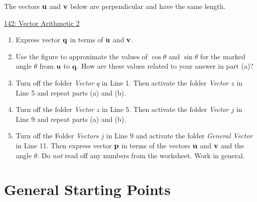 \documentclass{ximera}
\begin{document}
\begin{question} \label{QLf45445rr33r3}

The vectors ${\bf u}$ and ${\bf v}$ below are perpendicular and have the same length.

\begin{onlineOnly}
    \begin{center}
\end{center}
\end{onlineOnly}

\href{https://www.desmos.com/calculator/prtepbs3ul}{142: Vector Arithmetic 2}


\begin{enumerate}
\item Express vector ${\bf q}$ in terms of ${\bf u}$ and ${\bf v}$. 

\item Use the figure to approximate the values of $\cos\theta$ and $\sin\theta$ for the marked angle $\theta$ from ${\bf u}$ to ${\bf q}$. How are these values related to your answer in part (a)?

\item Turn off the folder \emph{Vector $q$} in Line 1. Then activate the folder \emph{Vector $z$} in Line 5 and repeat parts (a) and (b).

\item Turn off the folder \emph{Vector $z$} in Line 5. Then activate the folder \emph{Vector $j$} in Line 9 and repeat parts (a) and (b).


\item Turn off the Folder \emph{Vectors $j$} in Line 9 and activate the folder \emph{General Vector} in Line 11. Then express vector ${\bf p}$ in terms of the vectors ${\bf u}$ and ${\bf v}$ and the angle $\theta$. Do \emph{not} read off any numbers from the worksheet. Work in general.

\end{enumerate}
\end{question}


\section{General Starting Points}
\end{document}
